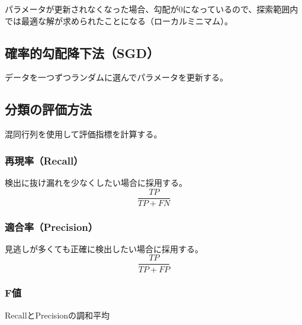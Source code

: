 \documentclass[b5paper,12pt]{jarticle}
\begin{document}
パラメータが更新されなくなった場合、勾配が0になっているので、探索範囲内では最適な解が求められたことになる（ローカルミニマム）。
\subsection{確率的勾配降下法（SGD）}
データを一つずつランダムに選んでパラメータを更新する。

\subsection{分類の評価方法}
混同行列を使用して評価指標を計算する。

\subsubsection{再現率（Recall）}
検出に抜け漏れを少なくしたい場合に採用する。
\[
  \frac{TP}{TP+FN}
\]

\subsubsection{適合率（Precision）}
見逃しが多くても正確に検出したい場合に採用する。
\[
  \frac{TP}{TP+FP}
\]

\subsubsection{F値}
RecallとPrecisionの調和平均
\end{document}
